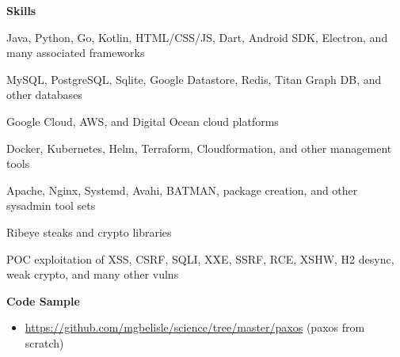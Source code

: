 \documentclass[10pt, a4paper]{article}
\begin{document}
\textbf{Skills}
\begin{itemize*}
  \item Java, Python, Go, Kotlin, HTML/CSS/JS, Dart, Android SDK, Electron, and many associated frameworks
  \item MySQL, PostgreSQL, Sqlite, Google Datastore, Redis, Titan Graph DB, and other databases
  \item Google Cloud, AWS, and Digital Ocean cloud platforms
  \item Docker, Kubernetes, Helm, Terraform, Cloudformation, and other management tools
  \item Apache, Nginx, Systemd, Avahi, BATMAN, package creation, and other sysadmin tool sets
  \item Ribeye steaks and crypto libraries
  \item POC exploitation of XSS, CSRF, SQLI, XXE, SSRF, RCE, XSHW, H2 desync, weak crypto, and many other vulns
\end{itemize*}
\textbf{Code Sample}
\begin{itemize}
  \item[] \url{https://github.com/mgbelisle/science/tree/master/paxos} (paxos from scratch)
\end{itemize}
\end{document}
